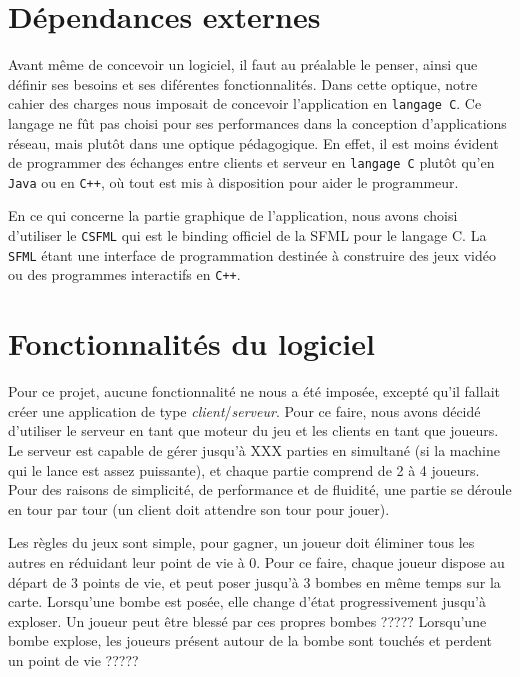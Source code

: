 \section*{Dépendances externes}

	Avant même de concevoir un logiciel, il faut au préalable le penser, ainsi que définir ses besoins et ses diférentes fonctionnalités. Dans cette optique, notre cahier des charges nous imposait de concevoir l'application en \texttt{langage C}. Ce langage ne fût pas choisi pour ses performances dans la conception d'applications réseau, mais plutôt dans une optique pédagogique. En effet, il est moins évident de programmer des échanges entre clients et serveur en \texttt{langage C} plutôt qu'en \texttt{Java} ou en \texttt{C++}, où tout est mis à disposition pour aider le programmeur.

\vspace{0.5cm}

	En ce qui concerne la partie graphique de l'application, nous avons choisi d'utiliser le \texttt{CSFML} qui est le binding officiel de la SFML pour le langage C. La \texttt{SFML} étant une interface de programmation destinée à construire des jeux vidéo ou des programmes interactifs en \texttt{C++}.

\section*{Fonctionnalités du logiciel}

	Pour ce projet, aucune fonctionnalité ne nous a été imposée, excepté qu'il fallait créer une application de type \textit{client}/\textit{serveur}. Pour ce faire, nous avons décidé d'utiliser le serveur en tant que moteur du jeu et les clients en tant que joueurs. Le serveur est capable de gérer jusqu'à XXX parties en simultané (si la machine qui le lance est assez puissante), et chaque partie comprend de 2 à 4 joueurs. Pour des raisons de simplicité, de performance et de fluidité, une partie se déroule en tour par tour (un client doit attendre son tour pour jouer). 

\vspace{0.5cm}

	Les règles du jeux sont simple, pour gagner, un joueur doit éliminer tous les autres en réduidant leur point de vie à 0. Pour ce faire, chaque joueur dispose au départ de 3 points de vie, et peut poser jusqu'à 3 bombes en même temps sur la carte. Lorsqu'une bombe est posée, elle change d'état progressivement jusqu'à exploser.
Un joueur peut être blessé par ces propres bombes ?????
Lorsqu'une bombe explose, les joueurs présent autour de la bombe sont touchés et perdent un point de vie ?????

